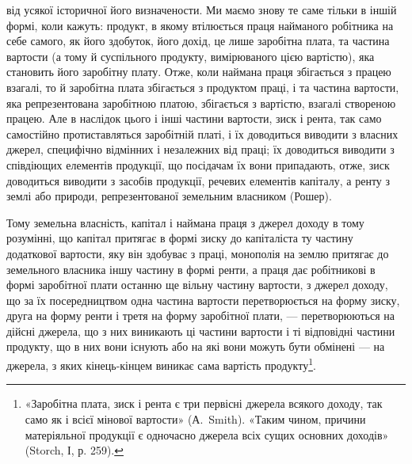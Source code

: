 \parcont{}  %
від усякої історичної його визначености. Ми маємо знову те саме тільки в іншій
формі, коли кажуть: продукт, в якому втілюється праця найманого робітника
на себе самого, як його здобуток, його дохід, це лише заробітна плата, та частина
вартости (а тому й суспільного продукту, вимірюваного цією вартістю),
яка становить його заробітну плату. Отже, коли наймана праця збігається з
працею взагалі, то й заробітна плата збігається з продуктом праці, і та частина
вартости, яка репрезентована заробітною платою, збігається з вартістю, взагалі
створеною працею. Але в наслідок цього і інші частини вартости, зиск і рента,
так само самостійно протиставляться заробітній платі, і їх доводиться виводити
з власних джерел, специфічно відмінних і незалежних від праці; їх доводиться
виводити з співдіющих елементів продукції, що посідачам їх вони припадають,
отже, зиск доводиться виводити з засобів продукції, речевих елементів капіталу,
а ренту з землі або природи, репрезентованої земельним власником (Рошер).

Тому земельна власність, капітал і наймана праця з джерел доходу в тому
розумінні, що капітал притягає в формі зиску до капіталіста ту частину додаткової
вартости, яку він здобуває з праці, монополія на землю притягає до
земельного власника іншу частину в формі ренти, а праця дає робітникові в
формі заробітної плати останню ще вільну частину вартости, з джерел доходу,
що за їх посередництвом одна частина вартости перетворюється на форму зиску,
друга на форму ренти і третя на форму заробітної плати, — перетворюються на
дійсні джерела, що з них виникають ці частини вартости і ті відповідні частини
продукту, що в них вони існують або на які вони можуть бути обмінені —
на джерела, з яких кінець-кінцем виникає сама вартість продукту\footnote{
«Заробітна плата, зиск і рента є три первісні джерела всякого доходу, так само як і всієї
мінової вартости» (А.~Smith). «Таким чином, причини матеріяльної продукції є одночасно джерела всіх
сущих основних доходів» (Storch, І, р. 259).
}.

